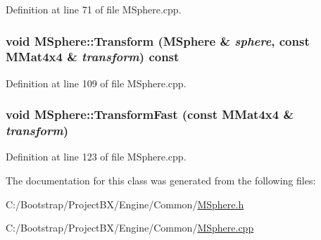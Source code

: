 Definition at line 71 of file MSphere.cpp.\hypertarget{class_m_sphere_5fc463a6eeba124194bfd8874055f4d2}{
\subsubsection[{Transform}]{\setlength{\rightskip}{0pt plus 5cm}void MSphere::Transform ({\bf MSphere} \& {\em sphere}, \/  const {\bf MMat4x4} \& {\em transform}) const}}
\label{class_m_sphere_5fc463a6eeba124194bfd8874055f4d2}




Definition at line 109 of file MSphere.cpp.\hypertarget{class_m_sphere_4e6ca0425808409f63a38cbee06ac92d}{
\subsubsection[{TransformFast}]{\setlength{\rightskip}{0pt plus 5cm}void MSphere::TransformFast (const {\bf MMat4x4} \& {\em transform})}}
\label{class_m_sphere_4e6ca0425808409f63a38cbee06ac92d}




Definition at line 123 of file MSphere.cpp.

The documentation for this class was generated from the following files:\begin{CompactItemize}
\item 
C:/Bootstrap/ProjectBX/Engine/Common/\hyperlink{_m_sphere_8h}{MSphere.h}\item 
C:/Bootstrap/ProjectBX/Engine/Common/\hyperlink{_m_sphere_8cpp}{MSphere.cpp}\end{CompactItemize}

